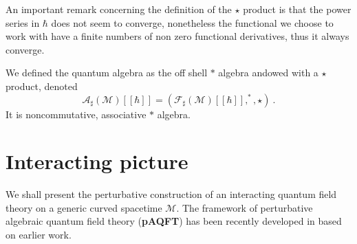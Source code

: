 \documentclass[10pt]{book}
\newcommand{\Acal}{\mathcal{A}}
\newcommand{\Fcal}{\mathcal{F}}
\newcommand{\Mcal}{\mathcal{M}}
\theoremstyle{break}
\begin{document}
\bigskip


An important remark concerning the definition of the $\star$ product is that the power series in $\hbar$ does not seem to converge, nonetheless the functional we choose to work with have a finite numbers of non zero functional derivatives, thus it always converge.


\bigskip


We defined the quantum algebra as the off shell $\ast$ algebra andowed with a $\star$ product, denoted 
%
\begin{equation*}
\Acal_\sharp(\Mcal)[[\hbar]] = \left(\Fcal_\sharp(\Mcal)[[\hbar]] , ^\ast , \star \right) \ . 
\end{equation*}
%
It is noncommutative, associative $\ast$ algebra.


\section{Interacting picture}


We shall present the perturbative construction of an interacting quantum field theory on a generic curved spacetime $\Mcal$. The framework of perturbative algebraic quantum field theory (\textbf{pAQFT}) has been recently developed in \cite{brunetti_perturbative_2009,fredenhagen_perturbative_2015,fredenhagen_batalin-vilkovisky_2013} based on earlier work.


\bigskip
\end{document}
